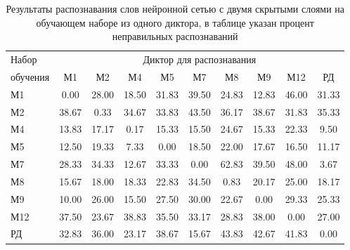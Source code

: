 \begin{table}[h]
	\centering
	\caption{Результаты распознавания слов нейронной сетью с двумя скрытыми слоями на обучающем наборе из одного диктора, в таблице указан процент неправильных распознаваний}
	\label{tab:mlp2_dictor1}
	\begin{tabular}{| l | c | c | c | c | c | c | c | c | c |}
		\hline
		Набор & \multicolumn{9}{c|}{Диктор для распознавания} \\
		\hhline{~---------}
		обучения \phantom{0000} & М1      & М2    	 & М4      & М5    	 & М7      & М8    	 & М9      & М12   	 & РД \\
		\hline
		М1		 &  0.00 & 28.00 & 18.50 & 31.83 & 39.50 & 24.83 & 12.83 & 46.00 & 31.33 \\
		М2		 & 38.67 &  0.33 & 34.67 & 33.83 & 43.50 & 36.17 & 38.67 & 31.83 & 35.33 \\
		М4		 & 13.83 & 17.17 &  0.17 & 15.33 & 15.50 & 24.67 & 15.33 & 22.33 &  9.50 \\
		М5		 & 12.50 & 19.33 &  7.33 &  0.00 & 18.50 & 22.00 & 17.67 & 16.50 & 11.17 \\
		М7		 & 28.33 & 34.33 & 12.67 & 33.33 &  0.00 & 62.83 & 39.50 & 48.00 &  3.67 \\
		М8		 & 15.67 & 18.00 & 18.33 & 22.83 & 34.50 &  0.83 & 20.17 & 25.00 & 18.17 \\
		М9		 & 10.00 & 26.00 & 15.50 & 27.50 & 30.00 & 22.67 &  0.00 & 29.33 & 25.33 \\
		М12		 & 37.50 & 23.67 & 38.83 & 35.50 & 33.17 & 28.83 & 38.00 &  0.00 & 27.00 \\
		РД		 & 32.83 & 36.00 & 23.17 & 38.67 & 15.67 & 43.83 & 42.67 & 41.83 &  0.00 \\
		\hline
	\end{tabular}
\end{table}


